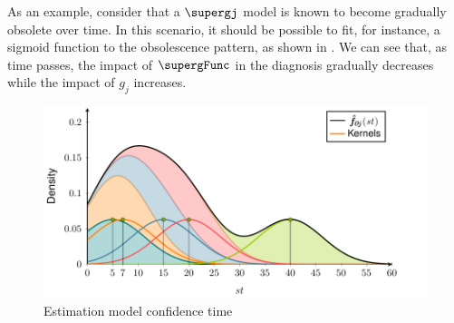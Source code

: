 As an example, consider that a $\supergj$ model is known to become
gradually obsolete over time.
%
In this scenario, it should be possible to fit, for instance, a
sigmoid function to the obsolescence pattern, as shown in
.
%
We can see that, as time passes, the impact of $\supergFunc$ in the
diagnosis gradually decreases while the impact of $g_j$ increases.

\begin{figure}[!ht]
  \includegraphics[page=4]{figures/nfge/figures/main}
  \caption{Estimation model confidence \vs{} time\label{fig:nfge:confidence_fn}}
\end{figure}


